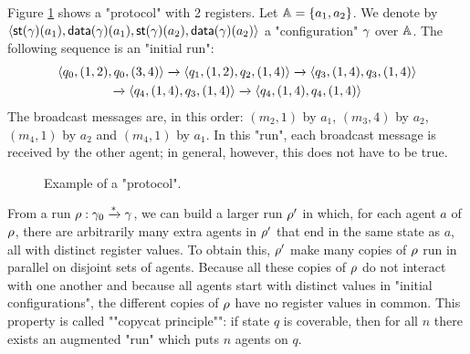 \begin{example}\label{ex:example-1}


	Figure \ref{fig:ex1} shows a "protocol" with 2 registers. 
	Let $\mathbb{A} = \{a_1, a_2\}$. We denote by $\langle \mathsf{st}(\gamma)(a_1), \mathsf{data}(\gamma)(a_1), \mathsf{st}(\gamma)(a_2),\mathsf{data}(\gamma)(a_2) \rangle$ a "configuration" $\gamma$ over $\mathbb{A}$. The following sequence is an "initial run":\vspace{-0.2cm}
	\begin{multline*}
		\langle q_0, (1,2), q_0,(3,4) \rangle \xrightarrow{} \langle q_1, (1,2), q_2,(1,4) \rangle \xrightarrow{} 
		\langle q_3, (1,4), q_3,(1,4) \rangle \\ \xrightarrow{} \langle q_4, (1,4), q_3,(1,4) \rangle \xrightarrow{} \langle q_4, (1,4), q_4,(1,4) \rangle
	\end{multline*}
	The broadcast messages are, in this order: $(m_2,1)$ by $a_1$, $(m_3,4)$ by $a_2$, $(m_4,1)$ by $a_2$ and $(m_4,1)$ by $a_1$. In this "run", each broadcast message is received by the other agent; in general, however, this does not have to be true.  
\end{example}

\begin{figure}[t]
	\centering
		
	\caption{Example of a "protocol".}\label{fig:ex1}
\end{figure}
	
	


\begin{remark}
	\label{rem:copycat-principle}
	From a run $\rho : \gamma_0 \xrightarrow{\ast} \gamma$, we can build a larger run $\rho'$ in which, for each agent $a$ of $\rho$, there are arbitrarily many extra agents in $\rho'$ that end in the same state as $a$, all with distinct register values. To obtain this, $\rho'$ make many copies of $\rho$ run in parallel on disjoint sets of agents. Because all these copies of $\rho$ do not interact with one another and because all agents start with distinct values in "initial configurations", the different copies of $\rho$ have no register values in common. This property is called ""copycat principle"": if state $q$ is coverable, then for all $n$ there exists an augmented "run" which puts $n$ agents on $q$.
\end{remark}

